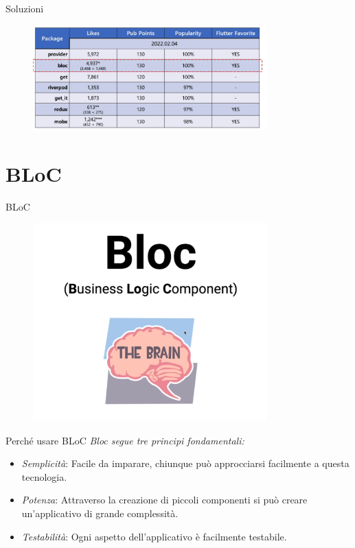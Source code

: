 \documentclass{../libs/presentation_format}
\begin{document}

\begin{frame}{Soluzioni}
	\begin{figure}[htpb]
		\centering
		\includegraphics[width=9cm]{../libs/state-management-stats}
	\end{figure}
\end{frame}


\section{BLoC}
\begin{frame}{BLoC}
	\begin{figure}[htpb]
		\centering
		\includegraphics[width=9cm]{../libs/bloc-first-logo}
	\end{figure}
\end{frame}


\begin{frame}{Perché usare BLoC}
	\emph{Bloc segue tre principi fondamentali:}
	\begin{itemize}
		\item \emph{Semplicità}: Facile da imparare, chiunque può approcciarsi facilmente a questa tecnologia.
		\item \emph{Potenza}: Attraverso la creazione di piccoli componenti si può creare un'applicativo di grande complessità.
		\item \emph{Testabilità}: Ogni aspetto dell'applicativo è facilmente testabile.
	\end{itemize}
\end{frame}
\end{document}
